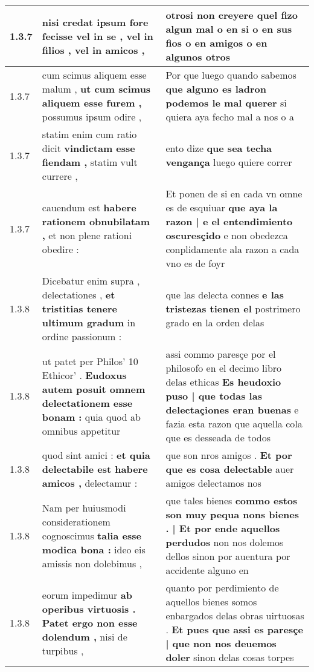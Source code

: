 \begin{tabular}{|p{1cm}|p{6.5cm}|p{6.5cm}|}
1.3.7 & nisi credat \textbf{ ipsum fore fecisse vel in se , vel in filios , } vel in amicos , & otrosi non creyere \textbf{ quel fizo algun mal } o en si o en sus fios o en amigos o en algunos otros \\\hline
1.3.7 & cum scimus aliquem esse malum , \textbf{ ut cum scimus aliquem esse furem , } possumus ipsum odire , & Por que luego quando sabemos \textbf{ que alguno es ladron podemos le mal querer } si quiera aya fecho mal a nos o a \\\hline
1.3.7 & statim enim cum ratio dicit \textbf{ vindictam esse fiendam , } statim vult currere , & ento dize \textbf{ que sea techa vengança } luego quiere correr \\\hline
1.3.7 & cauendum est \textbf{ habere rationem obnubilatam , } et non plene rationi obedire : & Et ponen de si en cada vn omne es de esquiuar \textbf{ que aya la razon | e el entendimiento oscuresçido } e non obedezca conplidamente ala razon a cada vno es de foyr \\\hline
1.3.8 & Dicebatur enim supra , delectationes , \textbf{ et tristitias tenere ultimum gradum } in ordine passionum : & que las delecta connes \textbf{ e las tristezas tienen el } postrimero grado en la orden delas \\\hline
1.3.8 & ut patet per Philos’ 10 Ethicor’ . \textbf{ Eudoxus autem posuit omnem delectationem esse bonam : } quia quod ab omnibus appetitur & assi commo paresçe por el philosofo en el decimo libro delas ethicas \textbf{ Es heudoxio puso | que todas las delectaçiones eran buenas } e fazia esta razon que aquella cola que es desseada de todos \\\hline
1.3.8 & quod sint amici : \textbf{ et quia delectabile est habere amicos , } delectamur : & que son nros amigos . \textbf{ Et por que es cosa delectable } auer amigos delectamos nos \\\hline
1.3.8 & Nam per huiusmodi considerationem cognoscimus \textbf{ talia esse modica bona : } ideo eis amissis non dolebimus , & que tales bienes \textbf{ commo estos son muy pequa nons bienes . | Et por ende aquellos perdudos } non nos dolemos dellos sinon por auentura por accidente alguno en \\\hline
1.3.8 & eorum impedimur \textbf{ ab operibus virtuosis . Patet ergo non esse dolendum , } nisi de turpibus , & quanto por perdimiento de aquellos bienes somos enbargados delas obras uirtuosas . \textbf{ Et pues que assi es paresçe | que non nos deuemos doler } sinon delas cosas torpes \\\hline

\end{tabular}
